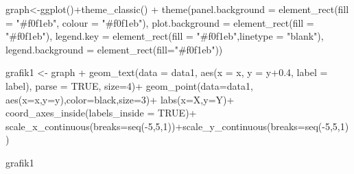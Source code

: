 \documentclass[
  letterpaper,
  DIV=11,
  numbers=noendperiod]{scrartcl}
\newenvironment{Shaded}{\begin{snugshade}}{\end{snugshade}}
\newcommand{\AttributeTok}[1]{\textcolor[rgb]{0.40,0.45,0.13}{#1}}
\newcommand{\ConstantTok}[1]{\textcolor[rgb]{0.56,0.35,0.01}{#1}}
\newcommand{\DecValTok}[1]{\textcolor[rgb]{0.68,0.00,0.00}{#1}}
\newcommand{\FloatTok}[1]{\textcolor[rgb]{0.68,0.00,0.00}{#1}}
\newcommand{\FunctionTok}[1]{\textcolor[rgb]{0.28,0.35,0.67}{#1}}
\newcommand{\NormalTok}[1]{\textcolor[rgb]{0.00,0.23,0.31}{#1}}
\newcommand{\OtherTok}[1]{\textcolor[rgb]{0.00,0.23,0.31}{#1}}
\newcommand{\SpecialCharTok}[1]{\textcolor[rgb]{0.37,0.37,0.37}{#1}}
\newcommand{\StringTok}[1]{\textcolor[rgb]{0.13,0.47,0.30}{#1}}
\begin{document}
\begin{Shaded}
\begin{Highlighting}[]
\NormalTok{graph}\OtherTok{\textless{}{-}}\FunctionTok{ggplot}\NormalTok{()}\SpecialCharTok{+}\FunctionTok{theme\_classic}\NormalTok{() }\SpecialCharTok{+}
  \FunctionTok{theme}\NormalTok{(}\AttributeTok{panel.background =} \FunctionTok{element\_rect}\NormalTok{(}\AttributeTok{fill =} \StringTok{"\#f0f1eb"}\NormalTok{,}
                                        \AttributeTok{colour =} \StringTok{"\#f0f1eb"}\NormalTok{),}
        \AttributeTok{plot.background =} \FunctionTok{element\_rect}\NormalTok{(}\AttributeTok{fill =} \StringTok{"\#f0f1eb"}\NormalTok{),}
        \AttributeTok{legend.key =} \FunctionTok{element\_rect}\NormalTok{(}\AttributeTok{fill =} \StringTok{"\#f0f1eb"}\NormalTok{,}\AttributeTok{linetype =} \StringTok{"blank"}\NormalTok{),}
        \AttributeTok{legend.background =} \FunctionTok{element\_rect}\NormalTok{(}\AttributeTok{fill=}\StringTok{"\#f0f1eb"}\NormalTok{))}

\NormalTok{grafik1 }\OtherTok{\textless{}{-}}\NormalTok{ graph }\SpecialCharTok{+}
  \FunctionTok{geom\_text}\NormalTok{(}\AttributeTok{data =}\NormalTok{ data1,}
            \FunctionTok{aes}\NormalTok{(}\AttributeTok{x =}\NormalTok{ x, }\AttributeTok{y =}\NormalTok{ y}\FloatTok{+0.4}\NormalTok{, }\AttributeTok{label =}\NormalTok{ label), }\AttributeTok{parse =} \ConstantTok{TRUE}\NormalTok{,}
            \AttributeTok{size=}\DecValTok{4}\NormalTok{)}\SpecialCharTok{+}
  \FunctionTok{geom\_point}\NormalTok{(}\AttributeTok{data=}\NormalTok{data1,}
             \FunctionTok{aes}\NormalTok{(}\AttributeTok{x=}\NormalTok{x,}\AttributeTok{y=}\NormalTok{y),}\AttributeTok{color=}\StringTok{\textquotesingle{}black\textquotesingle{}}\NormalTok{,}\AttributeTok{size=}\DecValTok{3}\NormalTok{)}\SpecialCharTok{+}
  \FunctionTok{labs}\NormalTok{(}\AttributeTok{x=}\StringTok{\textquotesingle{}X\textquotesingle{}}\NormalTok{,}\AttributeTok{y=}\StringTok{\textquotesingle{}Y\textquotesingle{}}\NormalTok{)}\SpecialCharTok{+}
  \FunctionTok{coord\_axes\_inside}\NormalTok{(}\AttributeTok{labels\_inside =} \ConstantTok{TRUE}\NormalTok{)}\SpecialCharTok{+}
  \FunctionTok{scale\_x\_continuous}\NormalTok{(}\AttributeTok{breaks=}\FunctionTok{seq}\NormalTok{(}\SpecialCharTok{{-}}\DecValTok{5}\NormalTok{,}\DecValTok{5}\NormalTok{,}\DecValTok{1}\NormalTok{))}\SpecialCharTok{+}\FunctionTok{scale\_y\_continuous}\NormalTok{(}\AttributeTok{breaks=}\FunctionTok{seq}\NormalTok{(}\SpecialCharTok{{-}}\DecValTok{5}\NormalTok{,}\DecValTok{5}\NormalTok{,}\DecValTok{1}\NormalTok{))}

\NormalTok{grafik1}
\end{Highlighting}
\end{Shaded}
\end{document}
